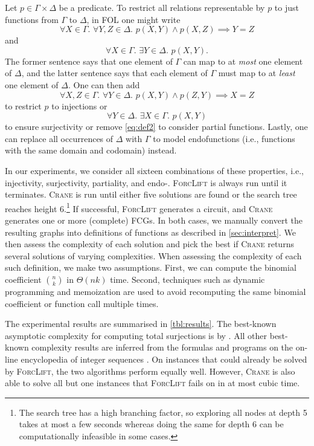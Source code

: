 \documentclass[letterpaper]{article} %
\theoremstyle{definition}
\begin{document}
Let $p \in \Gamma \times \Delta$ be a predicate. To restrict all relations
representable by $p$ to just functions from $\Gamma$ to $\Delta$, in FOL one
might write
\[
  \forall X \in \Gamma\text{. }\forall Y, Z \in \Delta\text{. }p(X, Y) \land p(X, Z) \implies Y = Z
\]
and
\begin{equation}\label{eq:def2}
  \forall X \in \Gamma\text{. }\exists Y \in \Delta\text{. }p(X, Y).
\end{equation}
The former sentence says that one element of $\Gamma$ can map to at \emph{most}
one element of $\Delta$, and the latter sentence says that each element of
$\Gamma$ must map to at \emph{least} one element of $\Delta$. One can then add
\[
  \forall X,Z \in \Gamma\text{. }\forall Y \in \Delta\text{. }p(X, Y) \land p(Z, Y) \implies X = Z
\]
to restrict $p$ to injections or
\[
  \forall Y \in \Delta\text{. }\exists X \in \Gamma\text{. }p(X, Y)
\]
to ensure surjectivity or remove \cref{eq:def2} to consider partial functions.
Lastly, one can replace all occurrences of $\Delta$ with $\Gamma$ to model
endofunctions (i.e., functions with the same domain and codomain) instead.

In our experiments, we consider all sixteen combinations of these properties,
i.e., injectivity, surjectivity, partiality, and endo-. \textsc{ForcLift} is
always run until it terminates. \textsc{Crane} is run until either five
solutions are found or the search tree reaches height 6.\footnote{The search
  tree has a high branching factor, so exploring all nodes at depth 5 takes at
  most a few seconds whereas doing the same for depth 6 can be computationally
  infeasible in some cases.} If successful, \textsc{ForcLift} generates a
circuit, and \textsc{Crane} generates one or more (complete) FCGs. In both
cases, we manually convert the resulting graphs into definitions of functions as
described in \cref{sec:interpret}. We then assess the complexity of each
solution and pick the best if \textsc{Crane} returns several solutions of
varying complexities. When assessing the complexity of each such definition, we
make two assumptions. First, we can compute the binomial coefficient
$\binom{n}{k}$ in $\Theta(nk)$ time. Second, techniques such as dynamic
programming and memoization are used to avoid recomputing the same binomial
coefficient or function call multiple times.

The experimental results are summarised in \cref{tbl:results}. The best-known
asymptotic complexity for computing total surjections is by \citet{30049}. All
other best-known complexity results are inferred from the formulas and programs
on the on-line encyclopedia of integer sequences \citep{oeis}. On instances that
could already be solved by \textsc{ForcLift}, the two algorithms perform equally
well. However, \textsc{Crane} is also able to solve all but one instances that
\textsc{ForcLift} fails on in at most cubic time.
\end{document}
